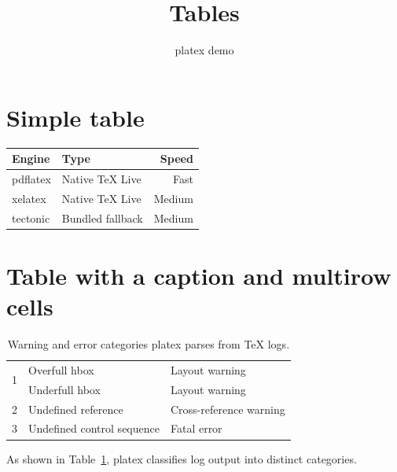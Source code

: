 \documentclass{article}
\title{Tables}
\author{platex demo}
\date{}
\begin{document}
\maketitle

\section{Simple table}
\begin{tabular}{l l r}
  \toprule
  Engine & Type & Speed \\
  \midrule
  pdflatex & Native TeX Live & Fast \\
  xelatex & Native TeX Live & Medium \\
  tectonic & Bundled fallback & Medium \\
  \bottomrule
\end{tabular}

\section{Table with a caption and multirow cells}
\begin{table}[h]
  \centering
  \begin{tabular}{|c|l|l|}
    \hline
    \multirow{2}{*}{1} & Overfull hbox & Layout warning \\
                        & Underfull hbox & Layout warning \\
    \hline
    2 & Undefined reference & Cross-reference warning \\
    \hline
    3 & Undefined control sequence & Fatal error \\
    \hline
  \end{tabular}
  \caption{Warning and error categories platex parses from TeX logs.}
  \label{tab:categories}
\end{table}

As shown in Table~\ref{tab:categories}, platex classifies log output into
distinct categories.
\end{document}
